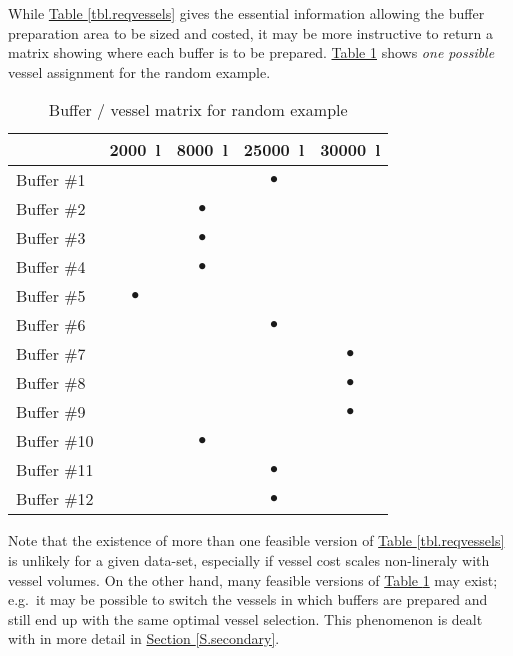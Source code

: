 While \hyperref[tbl.reqvessels]{Table \ref*{tbl.reqvessels}} gives the
essential information allowing the buffer preparation area to be sized and
costed, it may be more instructive to return a matrix showing where each buffer
is to be prepared. 
\hyperref[tbl.bvmatrix]{Table \ref*{tbl.bvmatrix}} shows \emph{one possible}
vessel assignment for the random example.

\begin{table}[h!]
    \centering
    \caption{Buffer / vessel matrix for random example}
    \label{tbl.bvmatrix}
    \begin{tabular}{l | c | c | c | c }
        & \SI{2000}{\litre} & \SI{8000}{\litre} & \SI{25000}{\litre} &
        \SI{30000}{\litre}\\ \hline
        Buffer \#1  & & & $\bullet$ & \\
        Buffer \#2  & & $\bullet$ & & \\
        Buffer \#3  & & $\bullet$ & & \\
        Buffer \#4  & & $\bullet$ & & \\
        Buffer \#5  & $\bullet$ & & & \\
        Buffer \#6  & & & $\bullet$ & \\
        Buffer \#7  & & & & $\bullet$ \\
        Buffer \#8  & & & & $\bullet$ \\
        Buffer \#9  & & & & $\bullet$ \\
        Buffer \#10 & & $\bullet$ & & \\
        Buffer \#11 & & & $\bullet$ & \\
        Buffer \#12 & & & $\bullet$ & \\
    \end{tabular}
\end{table}

Note that the existence of more than one feasible version of 
\hyperref[tbl.reqvessels]{Table \ref*{tbl.reqvessels}} is unlikely for a given
data-set, especially if vessel cost scales non-lineraly with vessel volumes.
On the other hand, many feasible versions of
\hyperref[tbl.bvmatrix]{Table \ref*{tbl.bvmatrix}} may exist; e.g.\ it may be
possible to switch the vessels in which buffers are prepared and still end up
with the same optimal vessel selection.
This phenomenon is dealt with in more detail in 
\hyperref[S.secondary]{Section \ref*{S.secondary}}.

